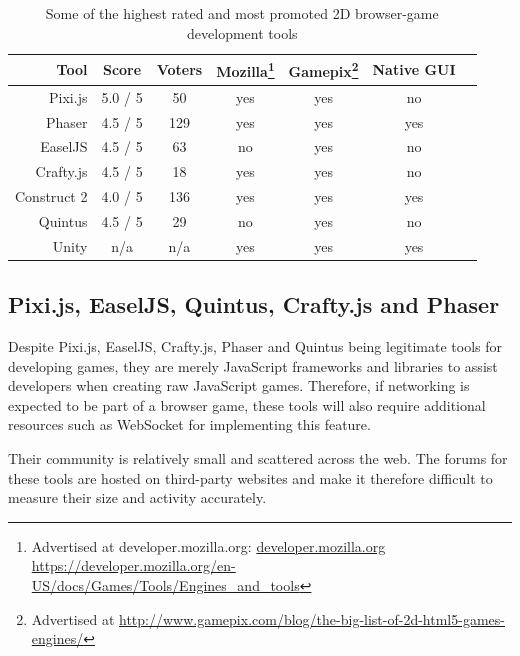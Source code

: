 \documentclass[bsc,frontabs,twoside,singlespacing,parskip,deptreport]{infthesis}     %
\begin{document}
\begin{savenotes}
\begin{table}
\centering
  \begin{tabular}{ | r || c | c | c | c | c | c | }
  	\hline
  	\textbf{Tool}			& \textbf{Score}		& \textbf{Voters}& \textbf{Mozilla}\footnote{Advertised at developer.mozilla.org: \url{developer.mozilla.org https://developer.mozilla.org/en-US/docs/Games/Tools/Engines\_and\_tools}} 	& \textbf{Gamepix}\footnote{Advertised at \url{http://www.gamepix.com/blog/the-big-list-of-2d-html5-games-engines/}} 	& \textbf{Native GUI}\\ \hline\hline
    Pixi.js			& 5.0 / 5	& 50	& yes	& yes	& no	\\ \hline
    Phaser			& 4.5 / 5	& 129	& yes	& yes	& yes	\\ \hline
    EaselJS			& 4.5 / 5	& 63	& no	& yes	& no	\\ \hline
    Crafty.js		& 4.5 / 5	& 18	& yes	& yes	& no	\\ \hline
    Construct 2		& 4.0 / 5	& 136	& yes	& yes	& yes	\\ \hline
   	Quintus			& 4.5 / 5	& 29	& no	& yes	& no	\\ \hline
  	Unity			& n/a		& n/a	& yes	& yes	& yes	\\ \hline
  \end{tabular}
  \caption{Some of the highest rated and most promoted 2D browser-game development tools}
  \label{table:Related_Tools}
\end{table}%
\end{savenotes}

\subsection{Pixi.js, EaselJS, Quintus, Crafty.js and Phaser}
Despite Pixi.js, EaselJS, Crafty.js, Phaser and Quintus being legitimate tools for developing games, they are merely JavaScript frameworks and libraries to assist developers when creating raw JavaScript games. Therefore, if networking is expected to be part of a browser game, these tools will also require additional resources such as WebSocket for implementing this feature.

Their community is relatively small and scattered across the web. The forums for these tools are hosted on third-party websites and make it therefore difficult to measure their size and activity accurately.
\end{document}
